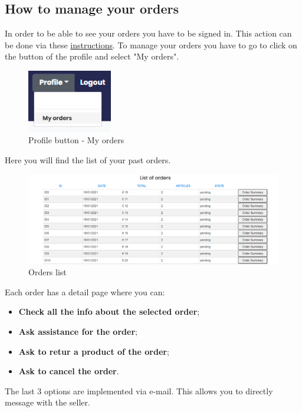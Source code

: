 \subsection{How to manage your orders} \label{_orders}
In order to be able to see your orders you have to be signed in. This action can be done via these \hyperref[_signin]{instructions}.
To manage your orders you have to go to click on the button of the profile and select "My orders".
\begin{figure}[H]
    \centering
    \includegraphics[width=10em]{res/images/cliente/profileorder.png}
    \caption{Profile button - My orders}
\end{figure}
Here you will find the list of your past orders.
\begin{figure}[H]
    \centering
    \includegraphics[width=\linewidth]{res/images/cliente/orders.png}
    \caption{Orders list}
\end{figure}
Each order has a detail page where you can:
\begin{itemize} 
    \item \textbf{Check all the info about the selected order};
    \item \textbf{Ask assistance for the order}; 
    \item \textbf{Ask to retur a product of the order}; 
    \item \textbf{Ask to cancel the order}.
\end{itemize}
The last 3 options are implemented via e-mail. This allows you to directly message with the seller.
